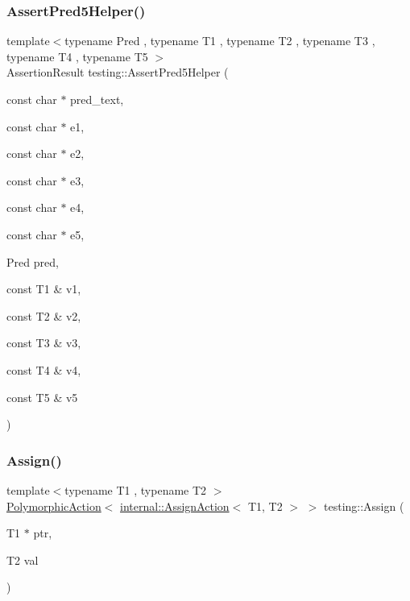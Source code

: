 \mbox{\label{namespacetesting_addcf52b273ce17269cbf4956cfe600a6}} 
\subsubsection{\texorpdfstring{AssertPred5Helper()}{AssertPred5Helper()}}
{\footnotesize\ttfamily template$<$typename Pred , typename T1 , typename T2 , typename T3 , typename T4 , typename T5 $>$ \\
Assertion\+Result testing\+::\+Assert\+Pred5\+Helper (\begin{DoxyParamCaption}\item[{const char $\ast$}]{pred\+\_\+text,  }\item[{const char $\ast$}]{e1,  }\item[{const char $\ast$}]{e2,  }\item[{const char $\ast$}]{e3,  }\item[{const char $\ast$}]{e4,  }\item[{const char $\ast$}]{e5,  }\item[{Pred}]{pred,  }\item[{const T1 \&}]{v1,  }\item[{const T2 \&}]{v2,  }\item[{const T3 \&}]{v3,  }\item[{const T4 \&}]{v4,  }\item[{const T5 \&}]{v5 }\end{DoxyParamCaption})}

\mbox{\label{namespacetesting_a630f14770743960d9d1b7c71cfd9034c}} 
\subsubsection{\texorpdfstring{Assign()}{Assign()}}
{\footnotesize\ttfamily template$<$typename T1 , typename T2 $>$ \\
\mbox{\hyperlink{classtesting_1_1_polymorphic_action}{Polymorphic\+Action}}$<$ \mbox{\hyperlink{classtesting_1_1internal_1_1_assign_action}{internal\+::\+Assign\+Action}}$<$ T1, T2 $>$ $>$ testing\+::\+Assign (\begin{DoxyParamCaption}\item[{T1 $\ast$}]{ptr,  }\item[{T2}]{val }\end{DoxyParamCaption})}

